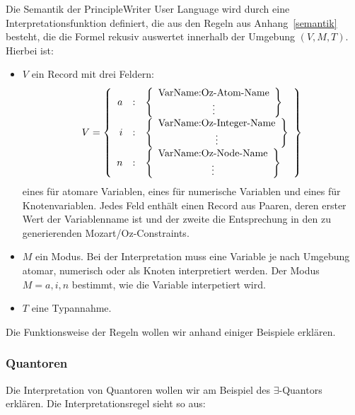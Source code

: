 Die Semantik der PrincipleWriter User Language wird durch eine
Interpretationsfunktion definiert, die aus den Regeln aus
Anhang~\ref{semantik} besteht, die die Formel rekusiv auswertet
innerhalb der Umgebung $(V,M,T)$. Hierbei ist:
\begin{itemize}
\item $V$ ein Record mit drei Feldern:
$$V= \left \{ \begin{array}{r c l}
a & : & \left \{ \begin{array}{c}\text{VarName:Oz-Atom-Name}\\ \vdots \end{array} \right \} \\
i & : & \left \{ \begin{array}{c}\text{VarName:Oz-Integer-Name}\\ \vdots \end{array} \right \} \\
n & : & \left \{ \begin{array}{c}\text{VarName:Oz-Node-Name}\\ \vdots \end{array} \right \} \\
\end{array}
\right \}$$ eines f\"ur atomare Variablen, eines f\"ur numerische
Variablen und eines f\"ur Knotenvariablen. Jedes Feld enth\"alt einen
Record aus Paaren, deren erster Wert der Variablenname ist und der
zweite die Entsprechung in den zu generierenden Mozart/Oz-Constraints.
\item $M$ ein Modus. Bei der Interpretation muss eine Variable je nach
Umgebung atomar, numerisch oder als Knoten interpretiert werden. Der
Modus $M={a,i,n}$ bestimmt, wie die Variable interpetiert wird.
\item $T$ eine Typannahme.
\end{itemize}

Die Funktionsweise der Regeln wollen wir anhand einiger Beispiele
erkl\"aren.

\subsubsection{Quantoren}

Die Interpretation von Quantoren wollen wir am Beispiel des
$\exists$-Quantors erkl\"aren. Die Interpretationsregel sieht so aus:

